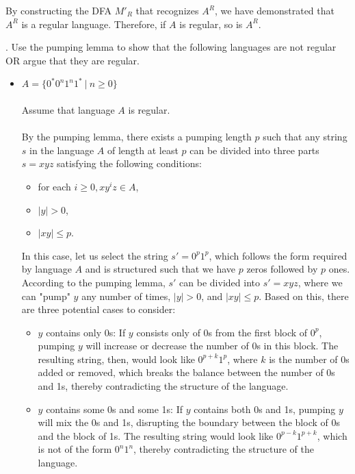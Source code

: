 \documentclass[12pt]{article}
\newcounter{quesnum}
\newcommand{\question}[2][??]{
\begin{list}{\labelitemi}{\leftmargin=2em}
\item [\arabic{quesnum}.] {} {#2}
\end{list}
\addtocounter{quesnum}{1}
}
\begin{document}
By constructing the DFA \( M'_R \) that recognizes \( A^R \), we have demonstrated that \( A^R \) is a regular language. Therefore, if \( A \) is regular, so is \( A^R \).

\vspace{12pt}

\question[3]{
Use the pumping lemma to show that the following languages are not regular OR argue that they are regular. 
}

\begin{itemize}
	\item $A= \{ 0^*0^n1^n1^* \ | \ n \geq 0\}$\\
\\
Assume that language $A$ is regular.\\
\\
By the pumping lemma, there exists a pumping length $p$ such that any string $s$ in the language $A$ of length at least $p$ can be divided into three parts $s = xyz$ satisfying the following conditions:
\begin{itemize}
    \item for each $i \geq 0, xy^iz \in A$,
    \item $|y| > 0$,
    \item $|xy| \leq p$.
\end{itemize}

In this case, let us select the string $s' = 0^p1^p$, which follows the form required by language $A$ and is structured such that we have $p$ zeros followed by $p$ ones.\\

According to the pumping lemma, $s'$ can be divided into $s' = xyz$, where we can "pump" $y$ any number of times, $|y| > 0$, and $|xy| \leq p$. Based on this, there are three potential cases to consider:

\begin{itemize}
    \item $y$ contains only 0s: If $y$ consists only of 0s from the first block of $0^p$, pumping $y$ will increase or decrease the number of 0s in this block. The resulting string, then, would look like $0^{p+k}1^p$, where $k$ is the number of 0s added or removed, which breaks the balance between the number of 0s and 1s, thereby contradicting the structure of the language.
    
    \item $y$ contains some 0s and some 1s: If $y$ contains both 0s and 1s, pumping $y$ will mix the 0s and 1s, disrupting the boundary between the block of 0s and the block of 1s. The resulting string would look like $0^{p-k}1^{p+k}$, which is not of the form $0^n1^n$, thereby contradicting the structure of the language.
    

\end{itemize}
\end{itemize}
\end{document}
